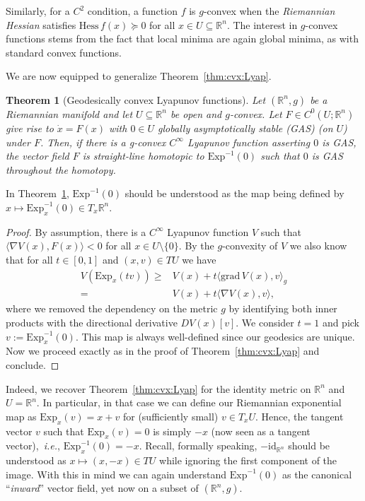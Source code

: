 \documentclass[letterpaper, 10 pt, conference]{ieeeconf}  %
\theoremstyle{mystyle}
\newtheorem{theorem}{Theorem}[section]
\begin{document}
Similarly, for a $C^2$ condition, a function $f$ is $g$-convex when the \textit{Riemannian Hessian} satisfies $\mathrm{Hess}\,f(x)\succeq 0$ for all $x\in U\subseteq  \mathbb{R}^n$. The interest in $g$-convex functions stems from the fact that local minima are again global minima, as with standard convex functions. 

We are now equipped to generalize Theorem~\ref{thm:cvx:Lyap}.

\begin{theorem}[Geodesically convex Lyapunov functions]
\label{thm:geod:cvx:Lyap}
Let $(\mathbb{R}^n,g)$ be a \textit{Riemannian manifold} and let $U\subseteq \mathbb{R}^n$ be open and $g$-convex. Let $F\in C^{0}(U;\mathbb{R}^n)$ give rise to $\dot{x}=F(x)$ with $0\in U$ globally asymptotically stable (GAS) (on $U$) under $F$. Then, if there is a g-convex $C^{\infty}$ Lyapunov function asserting $0$ is GAS, the vector field $F$ is straight-line homotopic to $\mathrm{Exp}^{-1}(0)$ such that $0$ is GAS throughout the homotopy.
\end{theorem}
In Theorem~\ref{thm:geod:cvx:Lyap}, $\mathrm{Exp}^{-1}(0)$ should be understood as the map being defined by $x\mapsto \mathrm{Exp}_x^{-1}(0)\in T_x\mathbb{R}^n$. 
\begin{proof}
By assumption, there is a $C^{\infty}$ Lyapunov function $V$ such that $\langle \nabla V(x),F(x) \rangle <0$ for all $x\in U\setminus\{0\}$. By the $g$-convexity of $V$ we also know that for all $t\in[0,1]$ and $(x,v)\in TU$ we have
\begin{align*}
    V(\mathrm{Exp}_x(tv))\geq& V(x)+t\langle \mathrm{grad}\,V(x),v\rangle_g\\
    =& V(x) + t\langle \nabla V(x),v\rangle,
\end{align*}
where we removed the dependency on the metric $g$ by identifying both inner products with the directional derivative $DV(x)[v]$. We consider $t=1$ and pick $v:=\mathrm{Exp}_x^{-1}(0)$. This map is always well-defined since our geodesics are unique. Now we proceed exactly as in the proof of Theorem~\ref{thm:cvx:Lyap} and conclude. 
\end{proof}

Indeed, we recover Theorem~\ref{thm:cvx:Lyap} for the identity metric on $\mathbb{R}^n$ and $U=\mathbb{R}^n$. In particular, in that case we can define our Riemannian exponential map as $\mathrm{Exp}_x(v)=x+v$ for (sufficiently small) $v\in T_xU$. Hence, the tangent vector $v$ such that $\mathrm{Exp}_x(v)=0$ is simply $-x$ (now seen as a tangent vector),~\textit{i.e.}, $\mathrm{Exp}_x^{-1}(0)=-x$. Recall, formally speaking, $-\mathrm{id}_{\mathbb{R}^n}$ should be understood as $x\mapsto (x,-x)\in TU$ while ignoring the first component of the image. With this in mind we can again understand $\mathrm{Exp}^{-1}(0)$ as the canonical ``\textit{inward}'' vector field, yet now on a subset of $(\mathbb{R}^n,g)$.  
\end{document}
